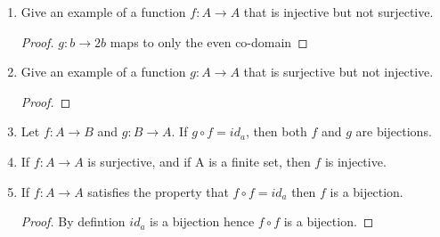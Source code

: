 \documentclass{article}
\begin{document}
\begin{enumerate}
\begin{proof}
    \end{proof}
  \item Give an example of a function $f : A\to A$ that is injective but not surjective.
    \begin{proof}
      $g : b\to 2b$ maps to only the even co-domain
    \end{proof}
  \item Give an example of a function $g : A\to A$ that is surjective but not injective. 
    \begin{proof}

    \end{proof}
  \item Let $f : A\to B$ and $g : B\to A$. If $g \circ f = id_{a}$, then both $f$ and $g$ are bijections.
  \item If $f : A\to A$ is surjective, and if A is a finite set, then $f$ is injective.
  \item If $f : A\to A$ satisfies the property that $f \circ f = id_{a}$ then $f$ is a bijection.
    \begin{proof}
      By defintion $id_{a}$ is a bijection hence $f \circ f$ is a bijection.
    \end{proof}
  \end{enumerate}
\end{document}
